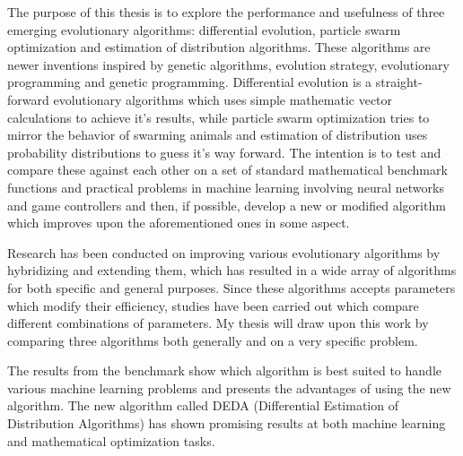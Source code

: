 The purpose of this thesis is to explore the performance and usefulness of three emerging evolutionary algorithms: differential evolution, particle swarm optimization and estimation of distribution algorithms. These algorithms are newer inventions inspired by genetic algorithms, evolution strategy, evolutionary programming and genetic programming. Differential evolution is a straight-forward evolutionary algorithms which uses simple mathematic vector calculations to achieve it's results, while particle swarm optimization tries to mirror the behavior of swarming animals and estimation of distribution uses probability distributions to guess it's way forward. The intention is to test and compare these against each other on a set of standard mathematical benchmark functions and practical problems in machine learning involving neural networks and game controllers and then, if possible, develop a new or modified algorithm which improves upon the aforementioned ones in some aspect.

Research has been conducted on improving various evolutionary algorithms by hybridizing and extending them, which has resulted in a wide array of algorithms for both specific and general purposes. Since these algorithms accepts parameters which modify their efficiency, studies have been carried out which compare different combinations of parameters. My thesis will draw upon this work by comparing three algorithms both generally and on a very specific problem.

The results from the benchmark show which algorithm is best suited to handle various machine learning problems and presents the advantages of using the new algorithm. The new algorithm called DEDA (Differential Estimation of Distribution Algorithms) has shown promising results at both machine learning and mathematical optimization tasks.
